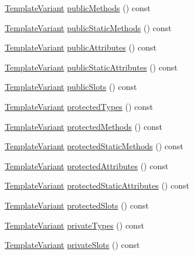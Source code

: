 \begin{DoxyCompactItemize}
\item 
\hyperlink{class_template_variant}{Template\+Variant} \hyperlink{class_class_context_1_1_private_a453852dca613cac6ad6c926e889728b8}{public\+Methods} () const 
\item 
\hyperlink{class_template_variant}{Template\+Variant} \hyperlink{class_class_context_1_1_private_a6adcdcde1d58e76951eeee7eb14d8839}{public\+Static\+Methods} () const 
\item 
\hyperlink{class_template_variant}{Template\+Variant} \hyperlink{class_class_context_1_1_private_a2aa12e64106fab9362ca06a735e3b95a}{public\+Attributes} () const 
\item 
\hyperlink{class_template_variant}{Template\+Variant} \hyperlink{class_class_context_1_1_private_af4c472e29f5f6157f27e8e746936c4cb}{public\+Static\+Attributes} () const 
\item 
\hyperlink{class_template_variant}{Template\+Variant} \hyperlink{class_class_context_1_1_private_a4fc7ec1703cf8f2c8d9e9b6d80990ade}{public\+Slots} () const 
\item 
\hyperlink{class_template_variant}{Template\+Variant} \hyperlink{class_class_context_1_1_private_a4b7a5643064259c77a3ea4a4782fad34}{protected\+Types} () const 
\item 
\hyperlink{class_template_variant}{Template\+Variant} \hyperlink{class_class_context_1_1_private_a1566b9fbbe73af2deadf2377bb52ec57}{protected\+Methods} () const 
\item 
\hyperlink{class_template_variant}{Template\+Variant} \hyperlink{class_class_context_1_1_private_a642495f5f12afbc17bec27527b084597}{protected\+Static\+Methods} () const 
\item 
\hyperlink{class_template_variant}{Template\+Variant} \hyperlink{class_class_context_1_1_private_acc390a939337e8f06b425d9859755729}{protected\+Attributes} () const 
\item 
\hyperlink{class_template_variant}{Template\+Variant} \hyperlink{class_class_context_1_1_private_aeb800049bb5fa893a3656c975ffbeeb0}{protected\+Static\+Attributes} () const 
\item 
\hyperlink{class_template_variant}{Template\+Variant} \hyperlink{class_class_context_1_1_private_a6dbf1a8b2832c9809d02379e1160dbd8}{protected\+Slots} () const 
\item 
\hyperlink{class_template_variant}{Template\+Variant} \hyperlink{class_class_context_1_1_private_a47f9c0206f64df92adc34e28dbf2ea48}{private\+Types} () const 
\item 
\hyperlink{class_template_variant}{Template\+Variant} \hyperlink{class_class_context_1_1_private_adb67be835e42770df235a98a7b31ca34}{private\+Slots} () const 

\end{DoxyCompactItemize}

